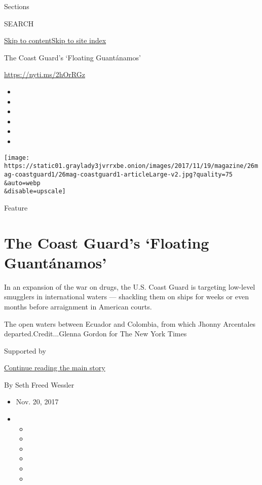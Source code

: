 Sections

SEARCH

\protect\hyperlink{site-content}{Skip to
content}\protect\hyperlink{site-index}{Skip to site index}

The Coast Guard's `Floating Guantánamos'

\url{https://nyti.ms/2hOrRGz}

\begin{itemize}
\item
\item
\item
\item
\item
\item
\end{itemize}

\texttt{[image: https://static01.graylady3jvrrxbe.onion/images/2017/11/19/magazine/26mag-coastguard1/26mag-coastguard1-articleLarge-v2.jpg?quality=75\\\&auto=webp\\\&disable=upscale]}

Feature

\hypertarget{the-coast-guards-floating-guantuxe1namos}{%
\section{The Coast Guard's `Floating
Guantánamos'}\label{the-coast-guards-floating-guantuxe1namos}}

In an expansion of the war on drugs, the U.S. Coast Guard is targeting
low-level smugglers in international waters --- shackling them on ships
for weeks or even months before arraignment in American courts.

The open waters between Ecuador and Colombia, from which Jhonny
Arcentales departed.Credit...Glenna Gordon for The New York Times

Supported by

\protect\hyperlink{after-sponsor}{Continue reading the main story}

By Seth Freed Wessler

\begin{itemize}
\item
  Nov. 20, 2017
\item
  \begin{itemize}
  \item
  \item
  \item
  \item
  \item
  \item
  \end{itemize}
\end{itemize}

